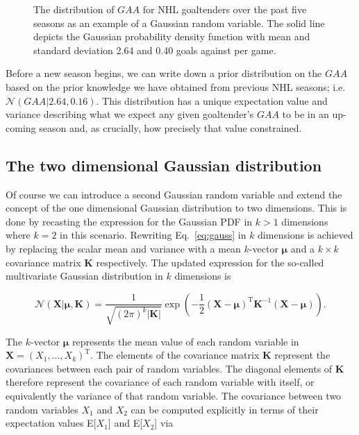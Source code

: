 \begin{figure}
  \centering
  \caption[Gaussian random variable in one dimension.]
      {The distribution of $GAA$ for NHL goaltenders over the past five
    seasons as an example of a Gaussian random variable. The solid line depicts
    the Gaussian probability density function with mean and standard
    deviation 2.64 and 0.40 goals against per game.}
  \label{fig:gaa1d}
\end{figure}

Before a new season begins, we can write down a prior distribution on the $GAA$
based on the prior knowledge we have obtained from previous NHL seasons; i.e.
$\mathcal{N}(GAA|2.64,0.16)$. This distribution has a unique expectation value and
variance describing what we expect any given goaltender's $GAA$ to be in an
up-coming season and, as crucially, how precisely that value constrained.

\subsection{The two dimensional Gaussian distribution}
Of course we can introduce a second Gaussian random variable and extend the 
concept of the one dimensional Gaussian distribution to two dimensions. This is done
by recasting the expression for the Gaussian PDF in $k>1$
dimensions where $k=2$ in this scenario. Rewriting Eq.~\ref{eq:gauss} in $k$
dimensions is achieved by replacing the scalar mean and variance with a mean
$k$-vector $\boldsymbol{\mu}$ and a $k \times k$ covariance matrix $\mathbf{K}$
respectively. The updated expression for the so-called multivariate Gaussian
distribution in $k$ dimensions is

\begin{equation}
  \mathcal{N}(\mathbf{X}|\boldsymbol{\mu},\mathbf{K}) = \frac{1}{\sqrt{(2\pi)^k
      |\mathbf{K}|}} \exp{\left( -\frac{1}{2} (\mathbf{X} -
    \boldsymbol{\mu})^{\text{T}} \mathbf{K}^{-1} (\mathbf{X}-\boldsymbol{\mu})
    \right)}.
  \label{eq:gauss2d}
\end{equation}

\noindent The $k$-vector $\boldsymbol{\mu}$ represents the mean value of each
random variable in $\mathbf{X}=(X_1,\dots,X_k)^{\text{T}}$.
The elements of the covariance matrix
$\mathbf{K}$ represent the covariances between each pair of random variables.
The diagonal elements of $\mathbf{K}$ therefore represent the covariance of each
random variable with itself, or equivalently the variance of that random variable.
The covariance between two random variables $X_1$ and $X_2$ can be computed explicitly
in terms of their expectation values E[$X_1$] and E[$X_2$] via

